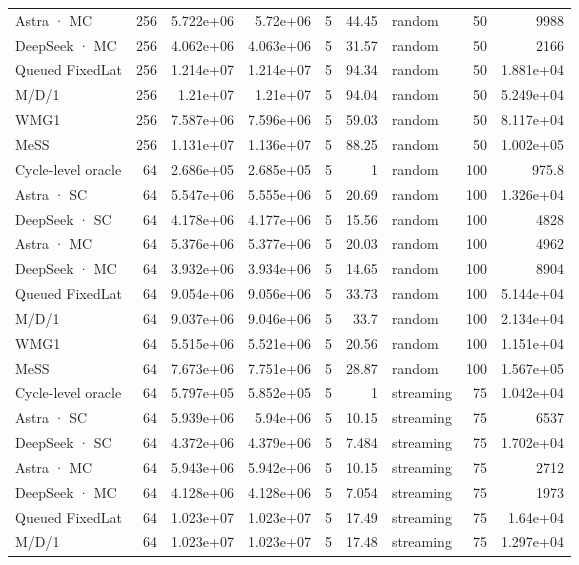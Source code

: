 \begin{tabular}{lrrrrrlrr}
Astra · MC & 256 & 5.722e+06 & 5.72e+06 & 5 & 44.45 & random & 50 & 9988 \\
DeepSeek · MC & 256 & 4.062e+06 & 4.063e+06 & 5 & 31.57 & random & 50 & 2166 \\
Queued FixedLat & 256 & 1.214e+07 & 1.214e+07 & 5 & 94.34 & random & 50 & 1.881e+04 \\
M/D/1 & 256 & 1.21e+07 & 1.21e+07 & 5 & 94.04 & random & 50 & 5.249e+04 \\
WMG1 & 256 & 7.587e+06 & 7.596e+06 & 5 & 59.03 & random & 50 & 8.117e+04 \\
MeSS & 256 & 1.131e+07 & 1.136e+07 & 5 & 88.25 & random & 50 & 1.002e+05 \\
Cycle-level oracle & 64 & 2.686e+05 & 2.685e+05 & 5 & 1 & random & 100 & 975.8 \\
Astra · SC & 64 & 5.547e+06 & 5.555e+06 & 5 & 20.69 & random & 100 & 1.326e+04 \\
DeepSeek · SC & 64 & 4.178e+06 & 4.177e+06 & 5 & 15.56 & random & 100 & 4828 \\
Astra · MC & 64 & 5.376e+06 & 5.377e+06 & 5 & 20.03 & random & 100 & 4962 \\
DeepSeek · MC & 64 & 3.932e+06 & 3.934e+06 & 5 & 14.65 & random & 100 & 8904 \\
Queued FixedLat & 64 & 9.054e+06 & 9.056e+06 & 5 & 33.73 & random & 100 & 5.144e+04 \\
M/D/1 & 64 & 9.037e+06 & 9.046e+06 & 5 & 33.7 & random & 100 & 2.134e+04 \\
WMG1 & 64 & 5.515e+06 & 5.521e+06 & 5 & 20.56 & random & 100 & 1.151e+04 \\
MeSS & 64 & 7.673e+06 & 7.751e+06 & 5 & 28.87 & random & 100 & 1.567e+05 \\
Cycle-level oracle & 64 & 5.797e+05 & 5.852e+05 & 5 & 1 & streaming & 75 & 1.042e+04 \\
Astra · SC & 64 & 5.939e+06 & 5.94e+06 & 5 & 10.15 & streaming & 75 & 6537 \\
DeepSeek · SC & 64 & 4.372e+06 & 4.379e+06 & 5 & 7.484 & streaming & 75 & 1.702e+04 \\
Astra · MC & 64 & 5.943e+06 & 5.942e+06 & 5 & 10.15 & streaming & 75 & 2712 \\
DeepSeek · MC & 64 & 4.128e+06 & 4.128e+06 & 5 & 7.054 & streaming & 75 & 1973 \\
Queued FixedLat & 64 & 1.023e+07 & 1.023e+07 & 5 & 17.49 & streaming & 75 & 1.64e+04 \\
M/D/1 & 64 & 1.023e+07 & 1.023e+07 & 5 & 17.48 & streaming & 75 & 1.297e+04 \\

\end{tabular}
